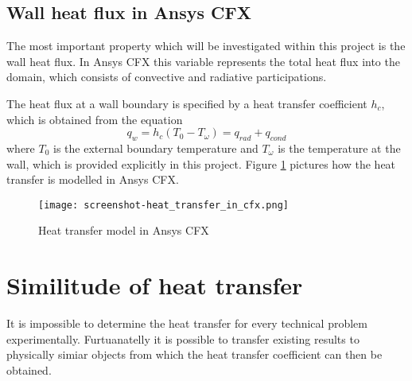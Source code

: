 \subsection{Wall heat flux in Ansys CFX}
The most important property which will be investigated within this project is the wall heat flux. In Ansys CFX this variable represents the total heat flux into the domain, which consists of convective and radiative participations.

The heat flux at a wall boundary is specified by a heat transfer coefficient $h_c$, which is obtained from the equation
\begin{equation}
q_w = h_c (T_0 - T_{\omega} ) = q_{rad} + q_{cond}
\end{equation}
where $T_0$ is the external boundary temperature and $T_{\omega}$ is the temperature at the wall, which is provided explicitly in this project. Figure \ref{fig:ht_in_cfx} pictures how the heat transfer is modelled in Ansys CFX.
\begin{figure}[ht]
\centering
\texttt{[image: screenshot-heat\_transfer\_in\_cfx.png]}
\caption{Heat transfer model in Ansys CFX}
\label{fig:ht_in_cfx}
\end{figure}
\section{Similitude of heat transfer}
It is impossible to determine the heat transfer for every technical problem experimentally. Furtuanatelly it is possible to transfer existing results to physically simiar objects from which the heat transfer coefficient can then be obtained.


